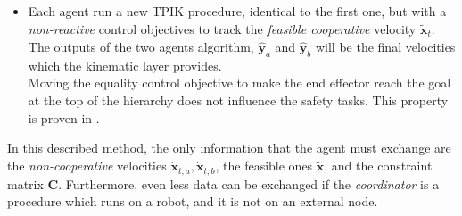 \begin{itemize}
	\item Each agent run a new TPIK procedure, identical to the first one, but with a \textit{non-reactive} control objectives to track the \textit{feasible cooperative} velocity $\dot{\tilde{\boldsymbol{x}}}_t$. The outputs of the two agents algorithm, $\dot{\hat{\boldsymbol{y}}}_a$ and $\dot{\hat{\boldsymbol{y}}}_b$ will be the final velocities which the kinematic layer provides.\\
	Moving the equality control objective to make the end effector reach the goal at the top of the hierarchy does not influence the safety tasks. This property is proven in \cite{tesiWander}.
\end{itemize}

In this described method, the only information that the agent must exchange are the
\textit{non-cooperative} velocities $\dot{\boldsymbol{x}}_{t,a}, \dot{\boldsymbol{x}}_{t,b}$, the feasible ones $\dot{\boldsymbol{\tilde{x}}}$, and the constraint matrix $\boldsymbol{C}$. Furthermore, even less data can be exchanged if the \textit{coordinator} is a procedure which runs on a robot, and it is not on an external node. 





